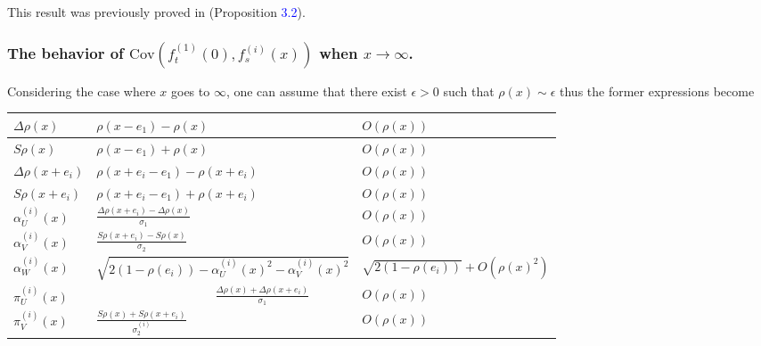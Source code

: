 \documentclass[12pt]{article}
\theoremstyle{Theorem}
\begin{document}
This result was previously proved in \cite{Psymetrie} (Proposition \textcolor{blue}{3.2}).
\subsubsection{The behavior of $\text{Cov}\left(f_{t}^{\scriptscriptstyle(1)}(0), f_{s}^{\scriptscriptstyle(i)}(x) \right)$ when $x\to \infty$.}
Considering the case where $x$ goes to $\infty$, one can assume that there exist $\epsilon > 0$ such that $\rho(x) \sim \epsilon$ thus the former expressions become \\

\begin{table}[H]
\begin{tabularx}{\textwidth}{|l| l|X|}
\hline
$\Delta \rho(x)$ & \hspace{4cm}$\rho(x-e_1)-\rho(x)$ & $O(\rho(x))$ \\ \hline
$S\rho(x)$ & \hspace{4cm}$\rho(x-e_1)+\rho(x)$ & $O(\rho(x))$ \\  \hline
$\Delta \rho(x+e_i)$ &\hspace{3cm} $\rho(x+e_i-e_1)-\rho(x+e_i)$ & $O(\rho(x))$ \\ \hline 
$S\rho(x + e_i)$ & \hspace{3cm}$\rho(x+e_i-e_1)+\rho(x+e_i)$ & $O(\rho(x))$ \\\hline 
$\alpha^{\scriptscriptstyle(i)}_{U}(x)$ &\hspace{4cm} $ \frac{\Delta \rho(x+e_i) -\Delta \rho(x)}{\sigma_1}$ & $O(\rho(x))$ \\  \hline
$\alpha^{\scriptscriptstyle(i)}_{V}(x)$ & \hspace{4cm}   $\frac{S\rho(x+e_i)-S\rho(x)}{\sigma_{2}}$  & $O(\rho(x))$ \\  \hline
$\alpha^{\scriptscriptstyle(i)}_{W}(x)$ & \hspace{2cm}$\sqrt{2(1 - \rho(e_{i})) - \alpha^{\scriptscriptstyle(i)}_{U}(x)^{2} - \alpha^{\scriptscriptstyle(i)}_{V}(x)^{2}} $ & {\tiny$ \sqrt{2(1 - \rho(e_i)) } + O\left(\rho(x)^{2}\right)$}\\ 
\hline
$\pi^{\scriptscriptstyle(i)}_{U}(x)$ & $ \hspace{4cm} \frac{\Delta \rho(x) + \Delta \rho(x+e_i) }{\sigma_1}$ & $O(\rho(x))$  \\ \hline
$ \pi^{\scriptscriptstyle(i)}_{V}(x)$ & \hspace{4cm}$\frac{S \rho(x) + S\rho(x+e_i)}{\sigma^{\scriptscriptstyle(i)}_{2}} $ & $O(\rho(x))$ \\ \hline 

\end{tabularx}
\end{table}
\end{document}
